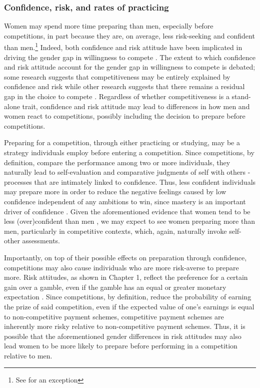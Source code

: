 \documentclass[a4paper, nobind]{templates/ociamthesis}
\begin{document}
\hypertarget{confidence-risk-and-rates-of-practicing}{%
\subsubsection{Confidence, risk, and rates of practicing}\label{confidence-risk-and-rates-of-practicing}}

Women may spend more time preparing than men, especially before competitions, in part because they are, on average, less risk-seeking \autocite{Croson2009,Dohmen2011b,Eckel2008,Bertrand2010a,Shurchkov2018} and confident \autocite{Bertrand2010,Lundeberg1994,Mobius2011,Barber2001,Croson2009,Shurchkov2018} than men.\footnote{See \textcite{Bandiera2022} for an exception} Indeed, both confidence and risk attitude have been implicated in driving the gender gap in willingness to compete \autocite{Veldhuizen2017,Gillen2019,Niederle2011}. The extent to which confidence and risk attitude account for the gender gap in willingness to compete is debated; some research suggests that competitiveness may be entirely explained by confidence and risk \autocite{Veldhuizen2017,Gillen2019} while other research suggests that there remains a residual gap in the choice to compete \autocite{Niederle2007}. Regardless of whether competitiveness is a stand-alone trait, confidence and risk attitude may lead to differences in how men and women react to competitions, possibly including the decision to prepare before competitions.

Preparing for a competition, through either practicing or studying, may be a strategy individuals employ before entering a competition. Since competitions, by definition, compare the performance among two or more individuals, they naturally lead to self-evaluation and comparative judgments of self with others - processes that are intimately linked to confidence. Thus, less confident individuals may prepare more in order to reduce the negative feelings caused by low confidence independent of any ambitions to win, since mastery is an important driver of confidence \autocite{Gist1992,Usher2008}. Given the aforementioned evidence that women tend to be less (over)confident than men \autocite{Mobius2011,Niederle2011,Croson2009,Lundeberg1994,Niederle2007,Bertrand2010a,Beyer1990,Beyer1997}, we may expect to see women preparing more than men, particularly in competitive contexts, which, again, naturally invoke self-other assessments.

Importantly, on top of their possible effects on preparation through confidence, competitions may also cause individuals who are more risk-averse to prepare more. Risk attitudes, as shown in Chapter 1, reflect the preference for a certain gain over a gamble, even if the gamble has an equal or greater monetary expectation \autocite{Kahneman1982}. Since competitions, by definition, reduce the probability of earning the prize of said competition, even if the expected value of one's earnings is equal to non-competitive payment schemes, competitive payment schemes are inherently more risky relative to non-competitive payment schemes. Thus, it is possible that the aforementioned gender differences in risk attitudes \autocite{Bertrand2010a,Croson2009} may also lead women to be more likely to prepare before performing in a competition relative to men.
\end{document}
